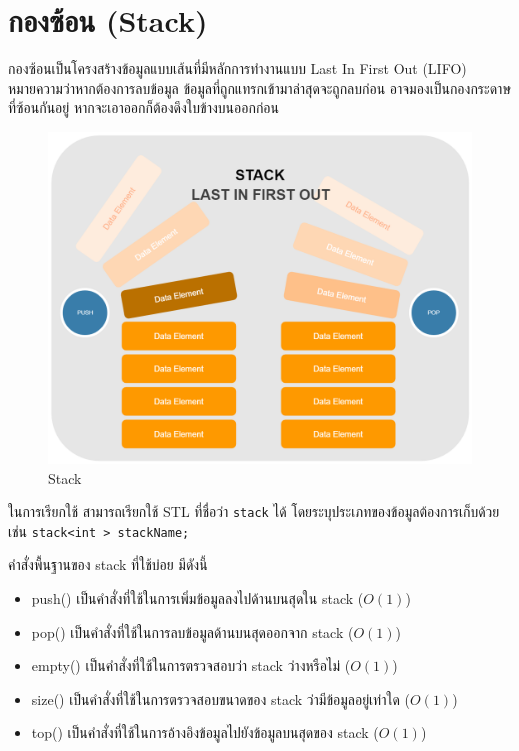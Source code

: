 \section{กองซ้อน (Stack)}

กองซ้อนเป็นโครงสร้างข้อมูลแบบเส้นที่มีหลักการทำงานแบบ Last In First Out (LIFO) หมายความว่าหากต้องการลบข้อมูล ข้อมูลที่ถูกแทรกเข้ามาล่าสุดจะถูกลบก่อน อาจมองเป็นกองกระดาษที่ซ้อนกันอยู่ หากจะเอาออกก็ต้องดึงใบข้างบนออกก่อน

\begin{figure}[h!]
    \centering
    \includegraphics[width=13cm]{images/stack_LIFO}
    \caption{Stack}
    \label{fig:stack}
\end{figure}

ในการเรียกใช้ สามารถเรียกใช้ STL ที่ชื่อว่า \texttt{stack} ได้ โดยระบุประเภทของข้อมูลต้องการเก็บด้วย เช่น \texttt{stack<int > stackName;}

คำสั่งพื้นฐานของ stack ที่ใช้บ่อย มีดังนี้
\begin{itemize}
\item push() เป็นคำสั่งที่ใช้ในการเพิ่มข้อมูลลงไปด้านบนสุดใน stack ($O(1)$)
\item pop() เป็นคำสั่งที่ใช้ในการลบข้อมูลด้านบนสุดออกจาก stack ($O(1)$)
\item empty() เป็นคำสั่งที่ใช้ในการตรวจสอบว่า stack ว่างหรือไม่ ($O(1)$)
\item size() เป็นคำสั่งที่ใช้ในการตรวจสอบขนาดของ stack ว่ามีข้อมูลอยู่เท่าใด ($O(1)$)
\item top() เป็นคำสั่งที่ใช้ในการอ้างอิงข้อมูลไปยังข้อมูลบนสุดของ stack ($O(1)$)
\end{itemize}

